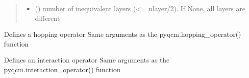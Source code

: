 \documentclass[letterpaper,10pt,english]{sphinxmanual}
\begin{document}
\begin{fulllineitems}
\begin{fulllineitems}
\begin{quote}
\begin{description}
\begin{itemize}
\item {} 
\sphinxAtStartPar
{} () \textendash{} number of inequivalent layers (\textless{}= nlayer/2). If None, all layers are different

\end{itemize}

\end{description}\end{quote}

\end{fulllineitems}


\begin{fulllineitems}
\label{\detokenize{utilities:pyqcm.slab.slab.hopping_operator}}
\sphinxAtStartPar
Defines a hopping operator
Same arguments as the pyqcm.hopping\_operator() function

\end{fulllineitems}


\begin{fulllineitems}
\label{\detokenize{utilities:pyqcm.slab.slab.interaction_operator}}
\sphinxAtStartPar
Defines an interaction operator
Same arguments as the pyqcm.interaction\_operator() function

\end{fulllineitems}


\end{fulllineitems}
\end{document}
